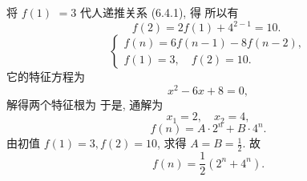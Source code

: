 \documentclass[punct]{ctexbeamer}
\newtheorem{ex}{例}[section]
\def\sol{\noindent {\bf 解\ }}
\begin{document}
\begin{frame}
	 将 $f(1)$ $=3$ 代人递推关系 (6.4.1), 得
	所以有
	$$
	f(2)=2 f(1)+4^{2-1}=10 \text {. }
	$$
	$$
	\left\{\begin{array}{l}
		f(n)=6 f(n-1)-8 f(n-2), \\
		f(1)=3, \quad f(2)=10 .
	\end{array}\right.
	$$
	它的特征方程为
	$$
	x^2-6 x+8=0,
	$$
	解得两个特征根为
	于是, 通解为
	$$
	x_1=2, \quad x_2=4,
	$$
	$$
	f(n)=A \cdot 2^n+B \cdot 4^n .
	$$
	由初值 $f(1)=3, f(2)=10$, 求得 $A=B=\frac{1}{2}$. 故
	$$
	f(n)=\frac{1}{2}\left(2^n+4^n\right) .
	$$
\end{frame}
%
%
\end{document}
